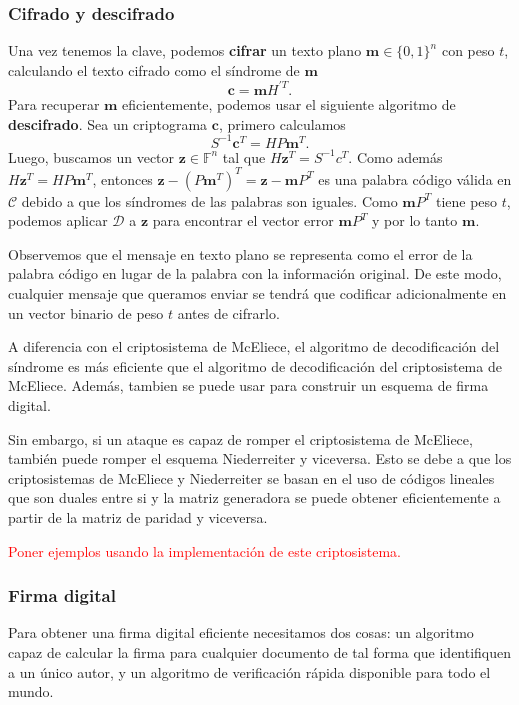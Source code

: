 \subsubsection{Cifrado y descifrado}

Una vez tenemos la clave, podemos \textbf{cifrar} un texto plano $\textbf{m} \in \{ 0, 1 \}^n$ con peso $t$, calculando el texto cifrado como el síndrome de $\textbf{m}$
\[
    \textbf{c} = \textbf{m} H^{'T}.
\]
Para recuperar $\textbf{m}$ eficientemente, podemos usar el siguiente algoritmo de \textbf{descifrado}. Sea un criptograma $\textbf{c}$, primero calculamos
\[
    S^{-1} \textbf{c}^T = H P \textbf{m}^T.
\]
Luego, buscamos un vector $\textbf{z} \in \mathbb{F}^n$ tal que $H \textbf{z}^T = S^{-1}c^T$. Como además $H \textbf{z}^T = HP\textbf{m}^T$, entonces $\textbf{z} - (P\textbf{m}^T)^T = \textbf{z} - \textbf{m}P^T$ es una palabra código válida en $\mathcal{C}$ debido a que los síndromes de las palabras son iguales. Como $\textbf{m}P^T$ tiene peso $t$, podemos aplicar $\mathcal{D}$ a $\textbf{z}$ para encontrar el vector error $\textbf{m}P^T$ y por lo tanto $\textbf{m}$.

Observemos que el mensaje en texto plano se representa como el error de la palabra código en lugar de la palabra con la información original. De este modo, cualquier mensaje que queramos enviar se tendrá que codificar adicionalmente en un vector binario de peso $t$ antes de cifrarlo.

A diferencia con el criptosistema de McEliece, el algoritmo de decodificación del síndrome es más eficiente que el algoritmo de decodificación del criptosistema de McEliece. Además, tambien se puede usar para construir un esquema de firma digital.

Sin embargo, si un ataque es capaz de romper el criptosistema de McEliece, también puede romper el esquema Niederreiter y viceversa. Esto se debe a que los criptosistemas de McEliece y Niederreiter se basan en el uso de códigos lineales que son duales entre si y la matriz generadora se puede obtener eficientemente a partir de la matriz de paridad y viceversa.

\textcolor{red}{Poner ejemplos usando la implementación de este criptosistema.}

\subsubsection{Firma digital}

Para obtener una firma digital eficiente necesitamos dos cosas: un algoritmo capaz de calcular la firma para cualquier documento de tal forma que identifiquen a un único autor, y un algoritmo de verificación rápida disponible para todo el mundo.

